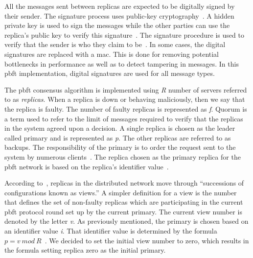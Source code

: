 All the messages sent between replicas are expected to be digitally signed by their sender. The signature process uses public-key cryptography~\cite[p.~257,p.267]{BOOK:BuildDepDistSyst}. A hidden private key is used to sign the messages while the other parties can use the replica's public key to verify this signature~\cite[p.~417]{PAPER:PBFTRecovery}. The signature procedure is used to verify that the sender is who they claim to be~\cite[p.~3]{PAPER:OGPBFT}. In some cases, the digital signatures are replaced with a \ac{mac}. This is done for removing potential bottlenecks in performance as well as to detect tampering in messages\cites[p.~257]{BOOK:BuildDepDistSyst}[p.~3,8]{PAPER:OGPBFT}. In this \ac{pbft} implementation, digital signatures are used for all message types.
\fi

The \ac{pbft} consensus algorithm is implemented using \emph{R} number of servers referred to as \emph{replicas}. When a replica is down or behaving maliciously, then we say that the replica is faulty. The number of faulty replicas is represented as \emph{f}.
Quorum is a term used to refer to the limit of messages required to verify that the replicas in the system agreed upon a decision\cites[p.~408-409]{PAPER:PBFTRecovery}[p.~2]{PAPER:DPBFT}.
A single replica is chosen as the leader called primary and is represented as \emph{p}. The other replicas are referred to as backups. The responsibility of the primary is to order the request sent to the system by numerous clients~\cites[p.~456]{BOOK:MVstandver3}[p.~405]{PAPER:PBFTRecovery}. The replica chosen as the primary replica for the \ac{pbft} network is based on the replica’s identifier value~\cite[p.~258]{BOOK:BuildDepDistSyst}.

According to~\cites[p.~3]{PAPER:OGPBFT}[p.~405]{PAPER:PBFTRecovery}, replicas in the distributed network move through “successions of configurations known as views.” A simpler definition for a view is the number that defines the set of non-faulty replicas which are participating in the current \ac{pbft} protocol round set up by the current primary. The current view number is denoted by the letter \emph{v}.
As previously mentioned, the primary is chosen based on an identifier value \emph{i}. That identifier value is determined by the formula $p = v ~mod~ R$~\cites{SLIDES:PBFT}[p.~258]{BOOK:BuildDepDistSyst}[p.~3]{PAPER:OGPBFT}.
We decided to set the initial view number to zero, which results in the formula setting replica zero as the initial primary.


